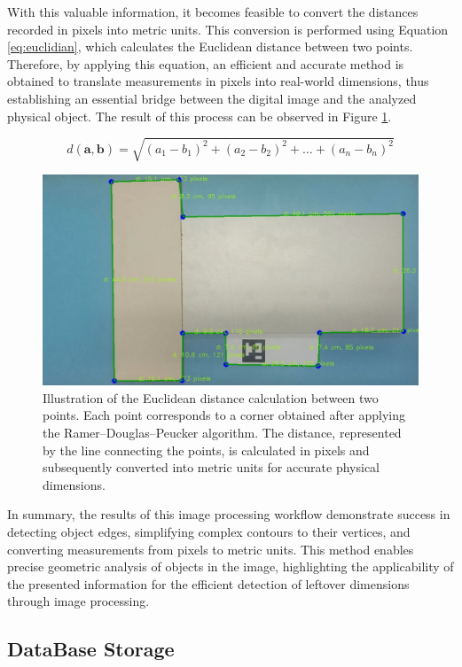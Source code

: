 With this valuable information, it becomes feasible to convert the distances recorded in pixels into metric units. This conversion is performed using Equation \eqref{eq:euclidian}, which calculates the Euclidean distance between two points. Therefore, by applying this equation, an efficient and accurate method is obtained to translate measurements in pixels into real-world dimensions, thus establishing an essential bridge between the digital image and the analyzed physical object. The result of this process can be observed in Figure \ref{fig:output}.

\begin{equation}
d(\mathbf{a}, \mathbf{b}) = \sqrt{(a_1-b_1)^2 + (a_2-b_2)^2 + \ldots + (a_n-b_n)^2}
\label{eq:euclidian}
\end{equation}
\begin{figure}[!ht]
 \centering
         \centering
         \includegraphics[width=0.65\linewidth]{images/Development/chap4/output.jpg}
         \caption{Illustration of the Euclidean distance calculation between two points. Each point corresponds to a corner obtained after applying the Ramer–Douglas–Peucker algorithm. The distance, represented by the line connecting the points, is calculated in pixels and subsequently converted into metric units for accurate physical dimensions.}
         \label{fig:output}
\end{figure}

In summary, the results of this image processing workflow demonstrate success in detecting object edges, simplifying complex contours to their vertices, and converting measurements from pixels to metric units. This method enables precise geometric analysis of objects in the image, highlighting the applicability of the presented information for the efficient detection of leftover dimensions through image processing.

\subsection{DataBase Storage}\label{section:leftover-database_storage}

